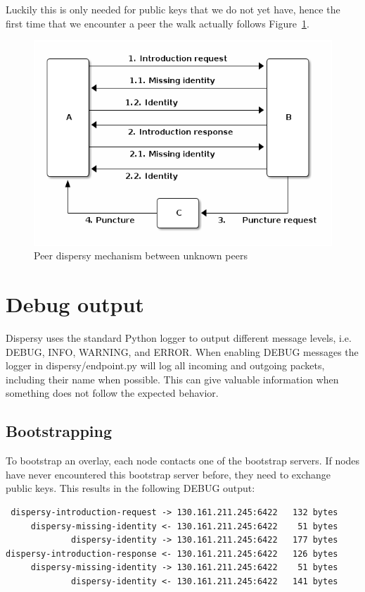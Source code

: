 Luckily this is only needed for public keys that we do not yet have,
hence the first time that we encounter a peer the walk actually
follows Figure~\ref{fig:walk-identity}.

\begin{figure}{}
\centering
\includegraphics[width=.9\linewidth]{walk-identity.png}
\caption{\label{fig:walk-identity}Peer dispersy mechanism between unknown peers}
\end{figure}
\section{Debug output}
\label{sec-9}
Dispersy uses the standard Python logger to output different message
levels, i.e. DEBUG, INFO, WARNING, and ERROR.  When enabling DEBUG
messages the logger in dispersy/endpoint.py will log all incoming and
outgoing packets, including their name when possible.  This can give
valuable information when something does not follow the expected
behavior.

\subsection{Bootstrapping}
\label{sec-9-1}
To bootstrap an overlay, each node contacts one of the bootstrap
servers.  If nodes have never encountered this bootstrap server
before, they need to exchange public keys.  This results in the
following DEBUG output:

\begin{verbatim}
 dispersy-introduction-request -> 130.161.211.245:6422   132 bytes
     dispersy-missing-identity <- 130.161.211.245:6422    51 bytes
             dispersy-identity -> 130.161.211.245:6422   177 bytes
dispersy-introduction-response <- 130.161.211.245:6422   126 bytes
     dispersy-missing-identity -> 130.161.211.245:6422    51 bytes
             dispersy-identity <- 130.161.211.245:6422   141 bytes
\end{verbatim}
